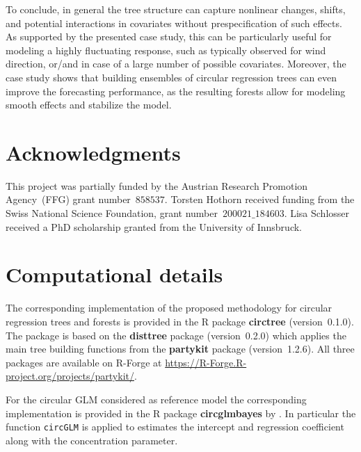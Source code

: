 \documentclass{statsoc}
\begin{document}
To conclude, in general the tree structure can capture nonlinear changes,
shifts, and potential interactions in covariates without prespecification of
such effects. As supported by the presented case study, this can be
particularly useful for modeling a highly fluctuating response, such as
typically observed for wind direction, or/and in case of a large number of
possible covariates. Moreover, the case study shows that building ensembles of
circular regression trees can even improve the forecasting performance, as the
resulting forests allow for modeling smooth effects and stabilize the model.


\section*{Acknowledgments}
This project was partially funded by the Austrian Research Promotion
Agency~(FFG) grant number~$858537$. Torsten Hothorn received funding from the
Swiss National Science Foundation, grant number~$200021\_184603$. Lisa
Schlosser received a PhD scholarship granted from the University of Innsbruck.

\section*{Computational details}
The corresponding implementation of the proposed methodology for circular
regression trees and forests is provided in the \textsf{R} package
\textbf{circtree} (version~0.1.0). The package is
based on the \textbf{disttree} package
(version~0.2.0) which applies the main tree
building functions from the \textbf{partykit} package
(version~1.2.6). All three packages are available
on \textsf{R}-Forge at {\url{https://R-Forge.R-project.org/projects/partykit/}}.

For the circular GLM considered as reference model the corresponding
implementation is provided in the \textsf{R} package \textbf{circglmbayes} by
\cite{Mulder+Klugkist:2017}. In particular the function \texttt{circGLM} is
applied to estimates the intercept and regression coefficient along with the
concentration parameter.




\end{document}

